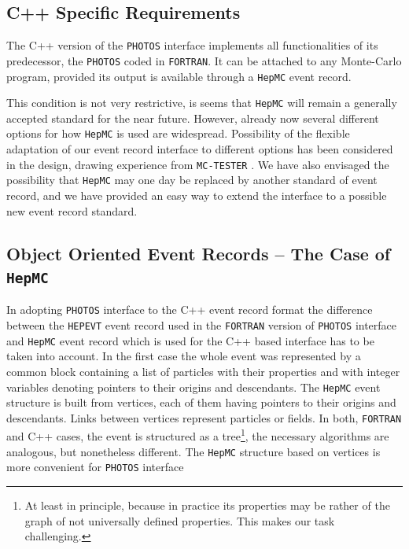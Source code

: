 \documentclass[]{Photos_interface_design}
\begin{document}
\subsection{C++ Specific Requirements}

The C++ version of the {\tt PHOTOS} interface implements all functionalities
of its predecessor, the {\tt PHOTOS} coded in {\tt FORTRAN}.
It can be attached to any Monte-Carlo program,
provided its output is available through a {\tt HepMC} \cite{Dobbs:2001ck} event record.

This condition is not very restrictive, is seems that {\tt HepMC} will
remain a generally accepted standard for the near future. However,
already now several different options for how {\tt HepMC} is used are
widespread. Possibility of the flexible  adaptation of our event record 
interface to different
options has been considered in the design,  drawing experience
from {\tt MC-TESTER} \cite{Golonka:2002rz,Davidson:2008ma}.
We have also
envisaged the possibility that {\tt HepMC} may one day be replaced by another
standard of event record, and we have provided an easy way to extend
the interface to a possible new event record standard.

\subsection{Object Oriented Event Records  -- The Case of {\tt HepMC}}
In adopting {\tt PHOTOS} interface to the C++ event record format
 the difference between the {\tt HEPEVT} event record used in the {\tt FORTRAN}
version of {\tt PHOTOS} interface and {\tt HepMC} event record  
which is used for the C++ based interface
has to be taken into account. 
In the first case the whole event was represented
by a common block containing a list of particles with their properties and
with integer 
variables denoting pointers to their origins and descendants.
 The {\tt HepMC} event structure
is built from vertices, each of them having pointers to their origins and descendants. Links between vertices represent particles or fields.
 In both, {\tt FORTRAN} and C++  
cases, the event is structured as 
a tree\footnote{At least in principle, because in practice its properties
may be rather of the graph of not universally defined properties.
This makes our task challenging.}, the necessary algorithms are  analogous, 
but nonetheless different. The {\tt HepMC} structure based on vertices is more
convenient for {\tt PHOTOS} interface
\end{document}
